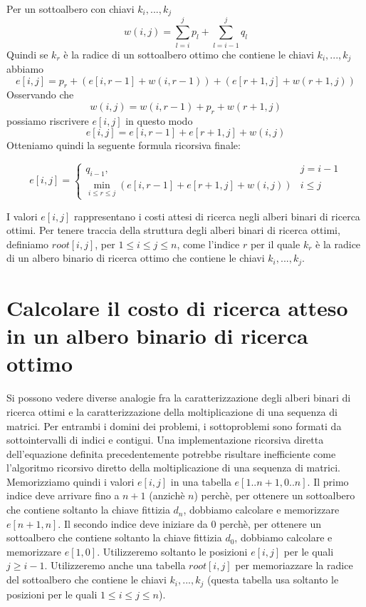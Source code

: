 Per un sottoalbero con chiavi $k_i, ..., k_j$
$$
  w(i , j) = \sum_{l = i}^{j} p_l + \sum_{l = i - 1}^{j} q_l
$$
Quindi se $k_r$ è la radice di un sottoalbero ottimo che contiene le
chiavi $k_i, ..., k_j$ abbiamo
$$
  e[i,j] = p_r + (e[i, r-1] + w(i, r-1)) + (e[r+1, j] + w(r+1, j))
$$
Osservando che
$$
  w(i,j) = w(i, r-1) + p_r + w(r+1, j)
$$
possiamo riscrivere $e[i,j]$ in questo modo
$$
  e[i,j] = e[i, r-1] + e[r+1, j] + w(i,j)
$$
Otteniamo quindi la seguente formula ricorsiva finale:

\begin{equation*}
  e[i,j] =
  \begin{cases}
    q_{i-1},                                              & j = i-1 \\
    \min_{i \le r \le j} (e[i, r-1] + e[r+1, j] + w(i,j)) & i \le j
  \end{cases}
\end{equation*}

I valori $e[i,j]$ rappresentano i costi attesi di ricerca negli alberi
binari di ricerca ottimi. Per tenere traccia della struttura degli
alberi binari di ricerca ottimi, definiamo $root[i,j]$, per
$1 \le i \le j \le n$, come l'indice $r$ per il quale $k_r$ è la
radice di un albero binario di ricerca ottimo che contiene le chiavi
$k_i , ..., k_j$.

\section{Calcolare il costo di ricerca atteso in un albero binario di ricerca ottimo}

Si possono vedere diverse analogie fra la caratterizzazione degli alberi
binari di ricerca ottimi e la caratterizzazione della moltiplicazione di
una sequenza di matrici. Per entrambi i domini dei problemi, i
sottoproblemi sono formati da sottointervalli di indici e contigui. Una
implementazione ricorsiva diretta dell'equazione definita
precedentemente potrebbe risultare inefficiente come l'algoritmo
ricorsivo diretto della moltiplicazione di una sequenza di matrici.\\
Memorizziamo quindi i valori $e[i,j]$ in una tabella
$e[1..n +1, 0..n]$. Il primo indice deve arrivare fino a $n+1$
(anzichè $n$) perchè, per ottenere un sottoalbero che contiene
soltanto la chiave fittizia $d_n$, dobbiamo calcolare e memorizzare
$e[n+1,n]$. Il secondo indice deve iniziare da 0 perchè, per ottenere
un sottoalbero che contiene soltanto la chiave fittizia $d_0$,
dobbiamo calcolare e memorizzare $e[1,0]$. Utilizzeremo soltanto le
posizioni $e[i,j]$ per le quali $j \ge i-1$. Utilizzeremo anche una
tabella $root[i,j]$ per memoriazzare la radice del sottoalbero che
contiene le chiavi $k_i, ..., k_j$ (questa tabella usa soltanto le
posizioni per le quali $1 \le i \le j \le n$).\\

